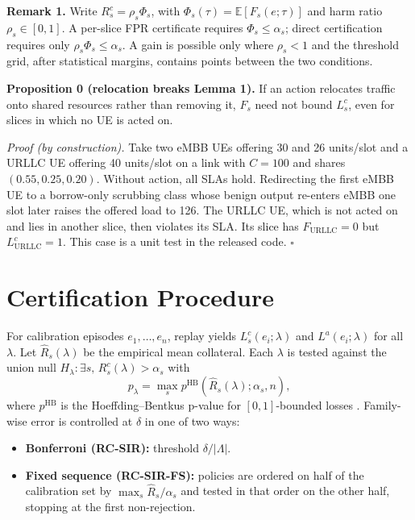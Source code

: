 \textbf{Remark 1.} Write \(R^c_s=\rho_s\Phi_s\), with
\(\Phi_s(\tau)=\mathbb{E}[F_s(e;\tau)]\) and harm ratio
\(\rho_s\in[0,1]\). A per-slice FPR certificate requires
\(\Phi_s\le\alpha_s\); direct certification requires only
\(\rho_s\Phi_s\le\alpha_s\). A gain is possible only where \(\rho_s<1\)
and the threshold grid, after statistical margins, contains points
between the two conditions.

\textbf{Proposition 0 (relocation breaks Lemma 1).} If an action
relocates traffic onto shared resources rather than removing it, \(F_s\)
need not bound \(L^c_s\), even for slices in which no UE is acted on.

\emph{Proof (by construction).} Take two eMBB UEs offering 30 and 26
units/slot and a URLLC UE offering 40 units/slot on a link with
\(C=100\) and shares \((0.55,0.25,0.20)\). Without action, all SLAs
hold. Redirecting the first eMBB UE to a borrow-only scrubbing class
whose benign output re-enters eMBB one slot later raises the offered
load to 126. The URLLC UE, which is not acted on and lies in another
slice, then violates its SLA. Its slice has \(F_{\mathrm{URLLC}}=0\) but
\(L^c_{\mathrm{URLLC}}=1\). This case is a unit test in the released
code. $\square$

\hypertarget{sec:method}{%
\section{Certification Procedure}\label{sec:method}}

For calibration episodes \(e_1,\dots,e_n\), replay yields
\(L^c_s(e_i;\lambda)\) and \(L^a(e_i;\lambda)\) for all \(\lambda\). Let
\(\hat{R}_s(\lambda)\) be the empirical mean collateral. Each
\(\lambda\) is tested against the union null
\(H_\lambda:\exists s,\,R^c_s(\lambda)>\alpha_s\) with
\[p_\lambda=\max_s p^{\mathrm{HB}}(\hat{R}_s(\lambda);\alpha_s,n),\]
where \(p^{\mathrm{HB}}\) is the Hoeffding--Bentkus p-value for
\([0,1]\)-bounded losses \cite{angelopoulos2025ltt}. Family-wise error
is controlled at \(\delta\) in one of two ways:

\begin{itemize}
\tightlist
\item
  \textbf{Bonferroni (RC-SIR):} threshold \(\delta/|\Lambda|\).
\item
  \textbf{Fixed sequence (RC-SIR-FS):} policies are ordered on half of
  the calibration set by \(\max_s\hat{R}_s/\alpha_s\) and tested in that
  order on the other half, stopping at the first non-rejection.
\end{itemize}

